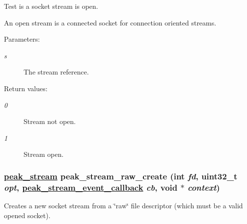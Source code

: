Test is a socket stream is open. 

An open stream is a connected socket for connection oriented streams.

\begin{Desc}
\item[Parameters:]
\begin{description}
\item[{\em s}]The stream reference.\end{description}
\end{Desc}
\begin{Desc}
\item[Return values:]
\begin{description}
\item[{\em 0}]Stream not open. \item[{\em 1}]Stream open. \end{description}
\end{Desc}
\hypertarget{group__stream__common_ga2}{
\subsubsection[peak\_\-stream\_\-raw\_\-create]{\setlength{\rightskip}{0pt plus 5cm}\hyperlink{group__stream_ga0}{peak\_\-stream} peak\_\-stream\_\-raw\_\-create (int {\em fd}, uint32\_\-t {\em opt}, \hyperlink{group__stream_ga1}{peak\_\-stream\_\-event\_\-callback} {\em cb}, void $\ast$ {\em context})}}
\label{group__stream__common_ga2}


Creates a new socket stream from a \char`\"{}raw\char`\"{} file descriptor (which must be a valid opened socket). 

